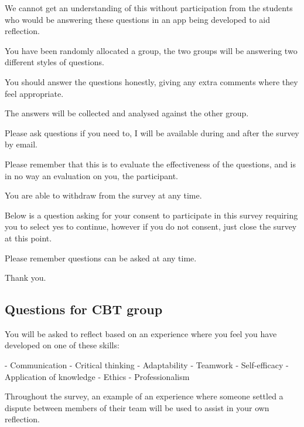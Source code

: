 \documentclass{l4proj}
\begin{document}
\begin{appendices}
We cannot get an understanding of this without participation from the students who would be answering these questions in an app being developed to aid reflection. 

You have been randomly allocated a group, the two groups will be answering two different styles of questions. 

You should answer the questions honestly, giving any extra comments where they feel appropriate.

The answers will be collected and analysed against the other group. 

Please ask questions if you need to, I will be available during and after the survey by email.

Please remember that this is to evaluate the effectiveness of the questions, and is in no way an evaluation on you, the participant.

You are able to withdraw from the survey at any time.

Below is a question asking for your consent to participate in this survey requiring you to select yes to continue, however if you do not consent, just close the survey at this point.

Please remember questions can be asked at any time.


Thank you.

\subsection{Questions for CBT group}

You will be asked to reflect based on an experience where you feel you have developed on one of these skills:

- Communication
- Critical thinking
- Adaptability
- Teamwork
- Self-efficacy
- Application of knowledge
- Ethics
- Professionalism 

Throughout the survey, an example of an experience where someone settled a dispute between members of their team will be used to assist in your own reflection.


\end{appendices}
\end{document}
